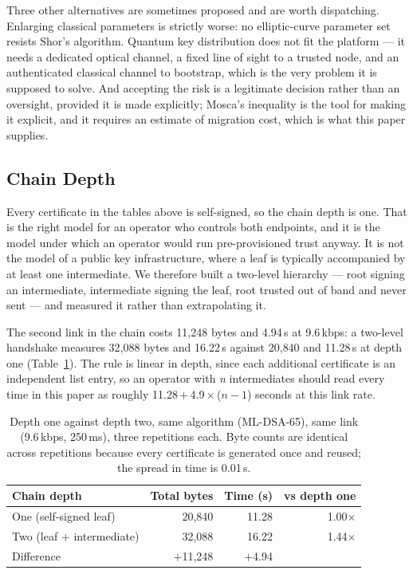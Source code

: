 \documentclass[drones,article,submit,pdftex,moreauthors]{Definitions/mdpi}
\newcommand{\kbps}{kbps}
\newcommand{\mldsa}{ML-DSA}
\begin{document}
Three other alternatives are sometimes proposed and are worth
dispatching. Enlarging classical parameters is strictly worse: no
elliptic-curve parameter set resists Shor's algorithm. Quantum key
distribution does not fit the platform --- it needs a dedicated optical
channel, a fixed line of sight to a trusted node, and an authenticated
classical channel to bootstrap, which is the very problem it is supposed
to solve. And accepting the risk is a legitimate decision rather than an
oversight, provided it is made explicitly; Mosca's inequality
\cite{mosca2018} is the tool for making it explicit, and it requires an
estimate of migration cost, which is what this paper supplies.

\subsection{Chain Depth}
\label{sec:chain}

Every certificate in the tables above is self-signed, so the chain depth
is one. That is the right model for an operator who controls both
endpoints, and it is the model under which an operator would run
pre-provisioned trust anyway. It is not the model of a public key
infrastructure, where a leaf is typically accompanied by at least one
intermediate. We therefore built a two-level hierarchy --- root signing
an intermediate, intermediate signing the leaf, root trusted out of band
and never sent --- and measured it rather than extrapolating it.

The second link in the chain costs 11{,}248 bytes and 4.94\,s at
9.6\,\kbps{}: a two-level handshake measures 32{,}088 bytes and
16.22\,s against 20{,}840 and 11.28\,s at depth one
(Table~\ref{tab:chain}). The rule is linear in depth, since each
additional certificate is an independent list entry, so an operator with
\emph{n} intermediates should read every time in this paper as roughly
\mbox{11.28\,$+$\,4.9\,$\times$\,($n-1$)} seconds at this link rate.

\begin{table}[H]
\centering
\small
\caption{Depth one against depth two, same algorithm (\mldsa{}-65),
same link (9.6\,\kbps{}, 250\,ms), three repetitions each. Byte counts
are identical across repetitions because every certificate is generated
once and reused; the spread in time is 0.01\,s.}
\label{tab:chain}
\begin{tabular}{@{}lrrr@{}}
\toprule
Chain depth & Total bytes & Time (s) & vs depth one \\
\midrule
One (self-signed leaf)      & 20{,}840 & 11.28 & 1.00$\times$ \\
Two (leaf $+$ intermediate) & 32{,}088 & 16.22 & 1.44$\times$ \\
\midrule
Difference                  & $+$11{,}248 & $+$4.94 & \\
\bottomrule
\end{tabular}
\end{table}
\end{document}

